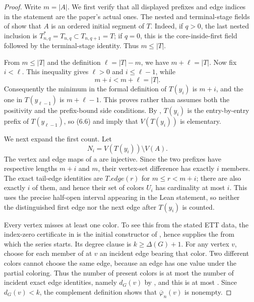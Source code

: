\begin{proof}
Write $m=|A|$.  We first verify that all displayed
prefixes and edge indices in the statement are the paper's actual ones.
The nested and terminal-stage fields of 
show that $A$ is an ordered initial segment of $T$.  Indeed, if $q>0$,
the last nested inclusion is $T_{n,q}^{*}=T_{n,q}\subset T_{n,q+1}=T$;
if $q=0$, this is the core-inside-first field followed by the terminal-stage
identity.  Thus $m\le |T|$.

From $m\le |T|$ and the definition $\ell=|T|-m$, we have
$m+\ell=|T|$.  Now fix $i<\ell$.  This inequality gives
$\ell>0$ and $i\le \ell-1$, while
\[
              m+i<m+\ell=|T|.
\]
Consequently the minimum in the formal definition of $T(y_i)$ is
$m+i$, and the one in $T(y_{\ell-1})$ is $m+\ell-1$.  This proves rather than
assumes both the positivity and the prefix-bound side conditions.  By
, $T(y_i)$ is the entry-by-entry prefix of
$T(y_{\ell-1})$, so (6.6) and
 imply that $V(T(y_i))$ is elementary.

We next expand the first count.  Let
\[
 N_i=V(T(y_i))\setminus V(A).
\]
The vertex and edge maps of a  are injective.
Since the two prefixes have respective lengths $m+i$ and $m$, their
vertex-set difference has exactly $i$ members.  The exact tail-edge
identities are $T.\mathit{edge}(r)$ for $m\le r<m+i$; there are also
exactly $i$ of them, and hence their set of colors $U_i$ has cardinality
at most $i$.  This uses the precise half-open interval appearing in the
Lean statement, so neither the distinguished first edge nor the next edge
after $T(y_i)$ is counted.

Every vertex misses at least one color.  To see this from the stated ETT
data, the index-zero certificate in  is the
initial constructor of , hence supplies the
 from which the series starts.  Its degree clause is
$k\ge\Delta(G)+1$.  For any vertex $v$, choose for each member of
 at $v$ an incident edge bearing that color.
Two different colors cannot choose the same edge, because an edge has one
value under the partial coloring.  Thus the number of present colors is at
most the number of incident exact edge identities, namely
$d_G(v)$ by , and this is at most
.  Since $d_G(v)<k$, the complement definition
 shows that $\overline\varphi_n(v)$ is nonempty.


\end{proof}
